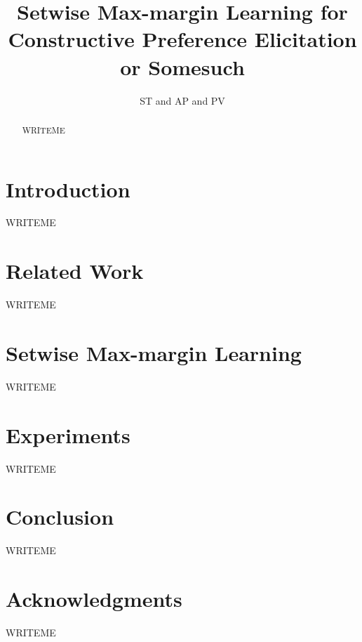 \documentclass{article}
\title{Setwise Max-margin Learning for Constructive Preference Elicitation or Somesuch}
\author{ST and AP and PV}
\begin{document}
\maketitle

\begin{abstract}
WRITEME
\end{abstract}

\section{Introduction}

WRITEME

\section{Related Work}

WRITEME

\section{Setwise Max-margin Learning}

WRITEME

\section{Experiments}

WRITEME

\section{Conclusion}

WRITEME

\section*{Acknowledgments}

WRITEME



\end{document}
